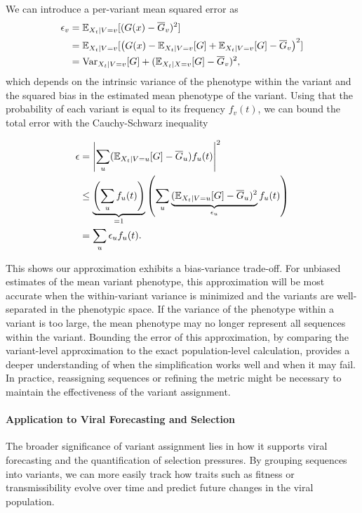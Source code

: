 We can introduce a per-variant mean squared error as 
\begin{align}
  \epsilon_v &= \mathbb{E}_{X_{t} \mid V=v}[(G(x) - \overline{G}_v)^2]\\
           &= \mathbb{E}_{X_{t} \mid V=v}[\left(G(x) - \mathbb{E}_{X_{t} \mid V=v}[G] + \mathbb{E}_{X_{t} \mid V=v}[G] - \overline{G}_v\right)^2 ]\\
           &= \text{Var}_{X_{t} \mid V=v}[G] + (\mathbb{E}_{X_t \mid X=v}[G] - \overline{G}_v)^2,
\end{align}
which depends on the intrinsic variance of the phenotype within the variant and the squared bias in the estimated mean phenotype of the variant.
Using that the probability of each variant is equal to its frequency $f_v(t)$, we can bound the total error with the Cauchy-Schwarz inequality

\begin{align}
  \epsilon  &= \left| \sum_{u} (\mathbb{E}_{X_{t} \mid V=u}[G] - \overline{G}_u) f_u(t)  \right|^2\\
            &\leq \underbrace{\left(\sum_{u} f_u(t) \right)}_{=1} \left(\sum_{u}  \underbrace{(\mathbb{E}_{X_{t} \mid V=u}[G] - \overline{G}_u)^2}_{\epsilon_u} f_u(t)\right)\\
          &= \sum_{u} \epsilon_u f_u(t).
\end{align}

This shows our approximation exhibits a bias-variance trade-off.
For unbiased estimates of the mean variant phenotype, this approximation will be most accurate when the within-variant variance is minimized and the variants are well-separated in the phenotypic space.
If the variance of the phenotype within a variant is too large, the mean phenotype may no longer represent all sequences within the variant.
Bounding the error of this approximation, by comparing the variant-level approximation to the exact population-level calculation, provides a deeper understanding of when the simplification works well and when it may fail.
In practice, reassigning sequences or refining the metric might be necessary to maintain the effectiveness of the variant assignment.

\paragraph{Application to Viral Forecasting and Selection}

The broader significance of variant assignment lies in how it supports viral forecasting and the quantification of selection pressures.
By grouping sequences into variants, we can more easily track how traits such as fitness or transmissibility evolve over time and predict future changes in the viral population.

